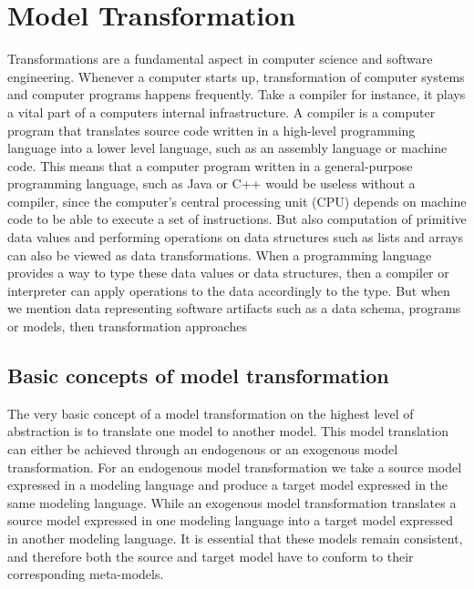 
\chapter{Model Transformation} %

\label{Chapter3} %



Transformations are a fundamental aspect in computer science and software
engineering. Whenever a computer starts up, transformation of computer systems
and computer programs happens frequently. Take a compiler for instance, it plays
a vital part of a computers internal infrastructure. A compiler is a computer
program that translates source code written in a high-level programming
language into a lower level language, such as an assembly language or machine
code. This means that a computer program written in a general-purpose
programming language, such as Java or C++ would be useless without a compiler,
since the computer's central processing unit (CPU) depends on machine code to be
able to execute a set of instructions. But also computation of primitive data
values and performing operations on data structures such as lists and arrays can
also be viewed as data transformations. When a programming language provides a way
to type these data values or data structures, then a compiler or interpreter can
apply operations to the data accordingly to the type. But when we mention
data representing software artifacts such as a data schema, programs or models,
then transformation approaches 

\section{Basic concepts of model transformation}

The very basic concept of a model transformation on the highest level of
abstraction is to translate one model to another model. This model translation
can either be achieved through an endogenous or an exogenous model
transformation. For an endogenous model transformation we take a source model
expressed in a modeling language and produce a target model expressed in the
same modeling language. While an exogenous model transformation translates a
source model expressed in one modeling language into a target model expressed in
another modeling language. It is essential that these models remain consistent,
and therefore both the source and target model have to conform to their
corresponding meta-models.


